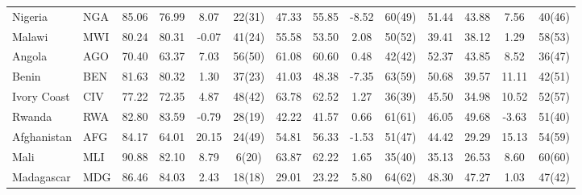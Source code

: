 {\begin{longtable}{m{2.3cm}lcccc|cccc|cccc}
Nigeria                           & NGA           & 85.06            & 76.99              & 8.07             & 22(31)           & 47.33    & 55.85      & -8.52    & 60(49)   & 51.44           & 43.88             & 7.56            & 40(46)          \\
Malawi                            & MWI           & 80.24            & 80.31              & -0.07            & 41(24)           & 55.58    & 53.50      & 2.08     & 50(52)   & 39.41           & 38.12             & 1.29            & 58(53)          \\
Angola                            & AGO           & 70.40            & 63.37              & 7.03             & 56(50)           & 61.08    & 60.60      & 0.48     & 42(42)   & 52.37           & 43.85             & 8.52            & 36(47)          \\
Benin                             & BEN           & 81.63            & 80.32              & 1.30             & 37(23)           & 41.03    & 48.38      & -7.35    & 63(59)   & 50.68           & 39.57             & 11.11           & 42(51)          \\
Ivory Coast                    & CIV           & 77.22            & 72.35              & 4.87             & 48(42)           & 63.78    & 62.52      & 1.27     & 36(39)   & 45.50           & 34.98             & 10.52           & 52(57)          \\
Rwanda                            & RWA           & 82.80            & 83.59              & -0.79            & 28(19)           & 42.22    & 41.57      & 0.66     & 61(61)   & 46.05           & 49.68             & -3.63           & 51(40)          \\
Afghanistan                       & AFG           & 84.17            & 64.01              & 20.15            & 24(49)           & 54.81    & 56.33      & -1.53    & 51(47)   & 44.42           & 29.29             & 15.13           & 54(59)          \\
Mali                              & MLI           & 90.88            & 82.10              & 8.79             & 6(20)            & 63.87    & 62.22      & 1.65     & 35(40)   & 35.13           & 26.53             & 8.60            & 60(60)          \\
Madagascar                        & MDG           & 86.46            & 84.03              & 2.43             & 18(18)           & 29.01    & 23.22      & 5.80     & 64(62)   & 48.30           & 47.27             & 1.03            & 47(42)          \\

\end{longtable}}
